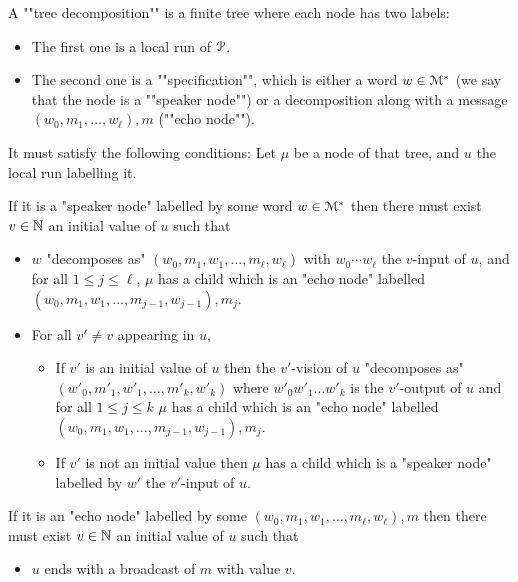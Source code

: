 \begin{definition}
	A ""tree decomposition""  is
	a finite tree where each node has two labels:
	\begin{itemize}
		\item The first one is a local run of $\mathcal{P}$. 
		
		\item The second one is a ""specification"", which is either a word $w \in \mathcal{M}^*$ (we say that the node is a ""speaker node"") or a decomposition along with a message $(w_0, m_1, \ldots, w_\ell), m$ (""echo node""). 
	\end{itemize} 
	
	It must satisfy the following conditions:
	Let $\mu$ be a node of that tree, and $u$ the local run labelling it.
	
	If it is a "speaker node" labelled by some word $w \in \mathcal{M}^*$ then there must exist $v \in \mathbb{N}$ an initial value of $u$ such that
	\begin{itemize}
		\item $w$ "decomposes as" $(w_0, m_1, w_1, \ldots, m_\ell, w_\ell)$ with $w_0 \cdots w_\ell$ the $v$-input of $u$, and for all $1 \leq j \leq \ell$, $\mu$ has a child which is an "echo node" labelled $(w_0, m_1, w_1, \ldots, m_{j-1}, w_{j-1}), m_j$.
		
		\item For all $v' \neq v$ appearing in $u$,
		\begin{itemize}
			\item If $v'$ is an initial value of $u$ then the $v'$-vision of $u$ "decomposes as"  $(w'_0, m'_1, w'_1, \ldots, m'_k, w'_k)$ where $w'_0 w'_1 \ldots w'_k$ is the $v'$-output of $u$ and for all $1 \leq j \leq k$ $\mu$ has a child which is an "echo node" labelled $(w_0, m_1, w_1, \ldots, m_{j-1}, w_{j-1}), m_j$.  
			
			\item If $v'$ is not an initial value then $\mu$ has a child which is a "speaker node" labelled by $w'$ the $v'$-input of $u$.
		\end{itemize}
	\end{itemize}
	
	If it is an "echo node" labelled by some $(w_0, m_1, w_1, \ldots, m_\ell, w_\ell), m$ then there must exist $v \in \mathbb{N}$ an initial value of $u$ such that
	\begin{itemize}
		\item $u$ ends with a broadcast of $m$ with value $v$.
		

\end{itemize}
\end{definition}
